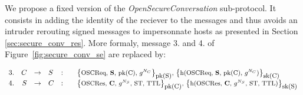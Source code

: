 We propose a fixed version of the {\em OpenSecureConversation} sub-protocol.
It consists in adding the identity of the reciever to the messages and thus 
avoids an intruder rerouting signed messages to impersonnate hosts as presented
in Section \ref{sec:secure_conv_res}.
More formaly, message 3. and 4. of Figure~\ref{fig:secure_conv_se} are replaced
by:

\arraycolsep=1.4pt
\begin{flushleft}
    \[\begin{array}{lrllll}
        3. & C & \rightarrow & S & : & \text{\small\sm{\oscreq, {\bf S}, pk(C), $g^{N_{C}}$}{pk(S)}{sk(C)}}\\
        4. & S & \rightarrow & C & : & \text{\small\sm{\oscres, {\bf C}, $g^{N_{S}}$, ST, TTL}{pk(C)}{sk(S)}}\\
    \end{array}\]
\end{flushleft}

%
%
%
%                
%                
%
%
%
%
%
%


